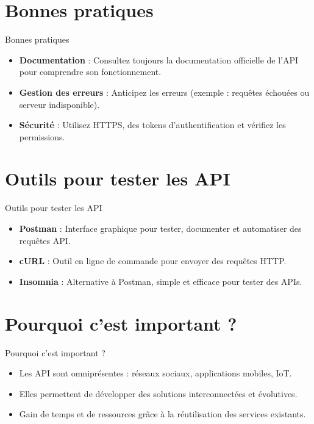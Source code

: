 \documentclass{clbeamer2024}
\begin{document}
\section{Bonnes pratiques}
\begin{frame}{Bonnes pratiques}
	\begin{itemize}
		\item \textbf{Documentation} : Consultez toujours la documentation officielle de l'API pour comprendre son fonctionnement.
		\item \textbf{Gestion des erreurs} : Anticipez les erreurs (exemple : requêtes échouées ou serveur indisponible).
		\item \textbf{Sécurité} : Utilisez HTTPS, des tokens d'authentification et vérifiez les permissions.
	\end{itemize}
\end{frame}


\section{Outils pour tester les API}
\begin{frame}{Outils pour tester les API}
	\begin{itemize}
		\item \textbf{Postman} : Interface graphique pour tester, documenter et automatiser des requêtes API.
		\item \textbf{cURL} : Outil en ligne de commande pour envoyer des requêtes HTTP.
		\item \textbf{Insomnia} : Alternative à Postman, simple et efficace pour tester des APIs.
	\end{itemize}
\end{frame}


\section{Pourquoi c'est important ?}
\begin{frame}{Pourquoi c'est important ?}
	\begin{itemize}
		\item Les API sont omniprésentes : réseaux sociaux, applications mobiles, IoT.
		\item Elles permettent de développer des solutions interconnectées et évolutives.
		\item Gain de temps et de ressources grâce à la réutilisation des services existants.
	\end{itemize}
\end{frame}
\end{document}
